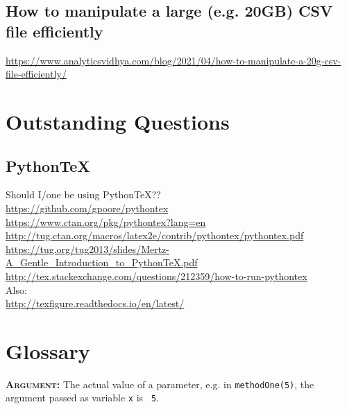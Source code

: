\documentclass[11pt,a4paper]{article}
\begin{document}
\subsection{How to manipulate a large (e.g. 20GB) CSV file efficiently}

\href{https://www.analyticsvidhya.com/blog/2021/04/how-to-manipulate-a-20g-csv-file-efficiently/}{https://www.analyticsvidhya.com/blog/2021/04/how-to-manipulate-a-20g-csv-file-efficiently/}



\newpage
\section{Outstanding Questions}

    \subsection{PythonTeX} 
    Should I/one be using PythonTeX??\\
    \href{https://github.com/gpoore/pythontex}{https://github.com/gpoore/pythontex}\\
    \href{https://www.ctan.org/pkg/pythontex?lang=en}{https://www.ctan.org/pkg/pythontex?lang=en}\\
    \href{http://tug.ctan.org/macros/latex2e/contrib/pythontex/pythontex.pdf}{http://tug.ctan.org/macros/latex2e/contrib/pythontex/pythontex.pdf}\\
    \href{https://tug.org/tug2013/slides/Mertz-A\_Gentle\_Introduction\_to\_PythonTeX.pdf}{https://tug.org/tug2013/slides/Mertz-A\_Gentle\_Introduction\_to\_PythonTeX.pdf}\\
    \href{http://tex.stackexchange.com/questions/212359/how-to-run-pythontex}{http://tex.stackexchange.com/questions/212359/how-to-run-pythontex}\\

\noindent
Also: \\
\href{http://texfigure.readthedocs.io/en/latest/}{http://texfigure.readthedocs.io/en/latest/}\\




\newpage
\section{Glossary}

\smallskip \smallskip
\noindent
\textbf{\textsc{Argument:}} The actual value of a parameter, e.g. in
{\tt methodOne(5)}, the argument passed as variable {\tt x} is {\tt
5}.
\end{document}
